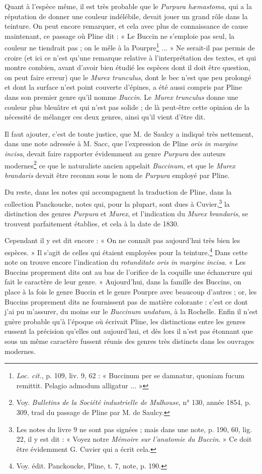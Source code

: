 \documentclass[a4paper, 11pt, oneside, polutonikogreek, french]{article}
\begin{document}
Quant à l'espèce même, il est très probable que le \emph{Purpura hæmastoma}, qui a la réputation de donner une couleur indélébile, devait jouer un grand rôle dans la teinture. On peut encore remarquer, et cela avec plus de connaissance de cause maintenant, ce passage où Pline dit : « Le Buccin ne s'emploie pas seul, la couleur ne tiendrait pas ; on le mêle à la Pourpre\footnote{\emph{Loc. cit.}, p. 109, liv. 9, 62 : « Buccinum per se damnatur, quoniam fucum remittit. Pelagio admodum alligatur ... »} ... » Ne serait-il pas permis de croire (et ici ce n'est qu'une remarque relative à l'interprétation des textes, et qui montre combien, avant d'avoir bien étudié les espèces dont il doit être question, on peut faire erreur) que le \emph{Murex trunculus}, dont le bec n'est que peu prolongé et dont la surface n'est point couverte d'épines, a été aussi compris par Pline dans son premier genre qu'il nomme \emph{Buccin}. Le \emph{Murex trunculus} donne une couleur plus bleuâtre et qui n'est pas solide ; de là peut-être cette opinion de la nécessité de mélanger ces deux genres, ainsi qu'il vient d'être dit.

Il faut ajouter, c'est de toute justice, que M. de Saulcy a indiqué très nettement, dans une note adressée à M. Sacc, que l'expression de Pline \emph{oris in margine incisa}, devait faire rapporter évidemment au genre \emph{Purpura} des auteurs modernes\footnote{Voy. \emph{Bulletins de la Société industrielle de Mulhouse}, n° 130, année 1854, p. 309, trad du passage de Pline par M. de Saulcy.} ce que le naturaliste ancien appelait \emph{Buccinum}, et que le \emph{Murex brandaris} devait être reconnu sous le nom de \emph{Purpura} employé par Pline.

Du reste, dans les notes qui accompagnent la traduction de Pline, dans la collection Panckoucke, notes qui, pour la plupart, sont dues à Cuvier,\footnote{Les notes du livre 9 ne sont pas signées ; mais dans une note, p. 190, 60, lig. 22, il y est dit : « Voyez notre \emph{Mémoire sur l'anatomie du Buccin}. » Ce doit être évidemment G. Cuvier qui a écrit cela.} la distinction des genres \emph{Purpura} et \emph{Murex}, et l'indication du \emph{Murex brandaris}, se trouvent parfaitement établies, et cela à la date de 1830.

Cependant il y est dit encore : « On ne connaît pas aujourd'hui très bien les espèces. » Il s'agit de celles qui étaient employées pour la teinture.\footnote{Voy. édit. Panckoucke, Pline, t. 7, note, p. 190.} Dans cette note on trouve encore l'indication du \emph{rotunditate oris in margine incisa}. « Les Buccins proprement dits ont au bas de l'orifice de la coquille une échancrure qui fait le caractère de leur genre. » Aujourd'hui, dans la famille des Buccins, on place à la fois le genre Buccin et le genre Pourpre avec beaucoup d'autres ; or, les Buccins proprement dits ne fournissent pas de matière colorante : c'est ce dont j'ai pu m'assurer, du moins sur le \emph{Buccinum undatum}, à la Rochelle. Enfin il n'est guère probable qu'à l'époque où écrivait Pline, les distinctions entre les genres eussent la précision qu'elles ont aujourd'hui, et dès lors il n'est pas étonnant que sous un même caractère fussent réunis des genres très distincts dans les ouvrages modernes.
\end{document}
